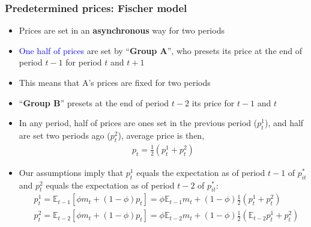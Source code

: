 \documentclass[10pt, xcolor=x11names, table]{beamer}
\begin{document}
\begin{frame}
\frametitle{Predetermined prices: Fischer model}
\begin{itemize}
\item Prices are set in an \textbf{asynchronous} way for two periods
\item \textcolor{blue}{One half of prices} are set by ``\textbf{Group A}'', who presets its price at the end of period $t-1$ for period $t$ and $t+1$
\item This means that A's prices are fixed for two periods
\item ``\textbf{Group B}'' presets at the end of period $t-2$ its price for $t-1$ and $t$
\item In any period, half of prices are ones set in the previous period ($p_{t}^{1}$), and half are set two periods ago ($p_{t}^{2}$), average price is then,
\begin{align*}
p_{t} = \frac{1}{2}(p_{t}^{1} + p_{t}^{2})
\end{align*}
\item Our assumptions imply that $p^{1}_{t}$ equals the expectation as of period $t-1$ of $p_{it}^{*}$ and $p^{2}_{t}$ equals the expectation as of period $t-2$ of $p_{it}^{*}$:
\begin{align*}
&p_{t}^{1} = \mathbb{E}_{t-1}[\phi{m_{t}} + (1-\phi)p_{t}] = \phi\mathbb{E}_{t-1}{m_{t}} + (1-\phi)\frac{1}{2}(p_{t}^{1} + p_{t}^{2}) \\
&p_{t}^{2} = \mathbb{E}_{t-2}[\phi{m_{t}} + (1-\phi)p_{t}] = \phi\mathbb{E}_{t-2}{m_{t}} + (1-\phi)\frac{1}{2}(\mathbb{E}_{t-2}p_{t}^{1} + p_{t}^{2})
\end{align*}
\end{itemize}
\end{frame}
\end{document}
